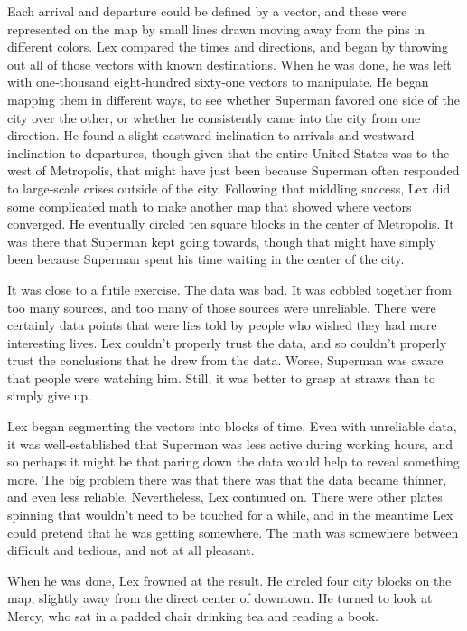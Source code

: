 Each arrival and departure could be defined by a vector, and these were
represented on the map by small lines drawn moving away from the pins in
different colors. Lex compared the times and directions, and began by
throwing out all of those vectors with known destinations. When he was
done, he was left with one‐thousand eight‐hundred sixty‐one vectors to
manipulate. He began mapping them in different ways, to see whether
Superman favored one side of the city over the other, or whether he
consistently came into the city from one direction. He found a slight
eastward inclination to arrivals and westward inclination to departures,
though given that the entire United States was to the west of
Metropolis, that might have just been because Superman often responded
to large‐scale crises outside of the city. Following that middling
success, Lex did some complicated math to make another map that showed
where vectors converged. He eventually circled ten square blocks in the
center of Metropolis. It was there that Superman kept going towards,
though that might have simply been because Superman spent his time
waiting in the center of the city.

It was close to a futile exercise. The data was bad. It was cobbled
together from too many sources, and too many of those sources were
unreliable. There were certainly data points that were lies told by
people who wished they had more interesting lives. Lex couldn't properly
trust the data, and so couldn't properly trust the conclusions that he
drew from the data. Worse, Superman was aware that people were watching
him. Still, it was better to grasp at straws than to simply give up.

Lex began segmenting the vectors into blocks of time. Even with
unreliable data, it was well‐established that Superman was less active
during working hours, and so perhaps it might be that paring down the
data would help to reveal something more. The big problem there was that
there was that the data became thinner, and even less reliable.
Nevertheless, Lex continued on. There were other plates spinning that
wouldn't need to be touched for a while, and in the meantime Lex could
pretend that he was getting somewhere. The math was somewhere between
difficult and tedious, and not at all pleasant.

When he was done, Lex frowned at the result. He circled four city blocks
on the map, slightly away from the direct center of downtown. He turned
to look at Mercy, who sat in a padded chair drinking tea and reading a
book.

